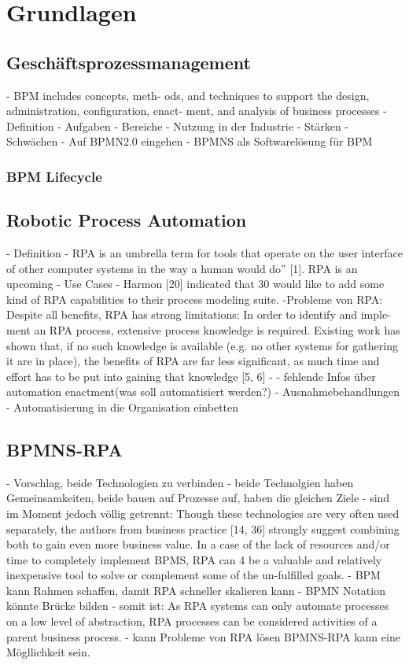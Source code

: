 \chapter{Grundlagen}
    \section{Geschäftsprozessmanagement}
   - BPM includes concepts, meth-
ods, and techniques to support the design, administration, conﬁguration, enact-
ment, and analysis of business processes
- Definition
- Aufgaben
- Bereiche
- Nutzung in der Industrie
- Stärken
- Schwächen
- Auf BPMN2.0 eingehen
- BPMNS als Softwarelösung für BPM
\subsection{BPM Lifecycle}
    \section{Robotic Process Automation}
- Definition
- RPA is an umbrella term for tools that operate on
the user interface of other computer systems in the way a human would do” [1].
RPA is an upcoming
- Use Cases
- Harmon [20] indicated that 30%
would like to add some kind of RPA capabilities to their process modeling suite. 
-Probleme von RPA:
Despite all beneﬁts, RPA has strong limitations: In order to identify and imple-
ment an RPA process, extensive process knowledge is required. Existing work
has shown that, if no such knowledge is available (e.g. no other systems for
gathering it are in place), the beneﬁts of RPA are far less signiﬁcant, as much
time and eﬀort has to be put into gaining that knowledge [5, 6]
- - fehlende Infos über automation enactment(was soll automatisiert werden?)
- Ausnahmebehandlungen
- Automatisierung in die Organisation einbetten

    \section{BPMNS-RPA}
- Vorschlag, beide Technologien zu verbinden
- beide Technolgien haben Gemeinsamkeiten, beide bauen auf Prozesse auf, haben die gleichen Ziele
- sind im Moment jedoch völlig getrennt: Though these technologies are very often used separately, the authors from business practice [14, 36] strongly suggest combining both to gain even more business value. In a case of the lack of resources and/or time to completely implement BPMS, RPA can
4 be a valuable and relatively inexpensive tool to solve or complement some of the un-fulfilled goals.
- BPM kann Rahmen schaffen, damit RPA schneller skalieren kann
- BPMN Notation könnte Brücke bilden
- somit ist: As RPA systems can only automate processes on a low level
of abstraction, RPA processes can be considered activities of a parent business
process.
- kann Probleme von RPA lösen
BPMNS-RPA kann eine Mögllichkeit sein.
